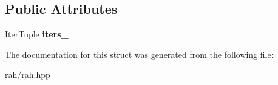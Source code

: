 \subsection*{Public Attributes}
\begin{DoxyCompactItemize}
\item 
\mbox{\label{struct_r_a_h___n_a_m_e_s_p_a_c_e_1_1view_1_1zip__iterator_aa562f95c73160c0980abbbedd2faf4c1}} 
Iter\+Tuple {\bfseries iters\+\_\+}
\end{DoxyCompactItemize}


The documentation for this struct was generated from the following file\+:\begin{DoxyCompactItemize}
\item 
rah/rah.\+hpp\end{DoxyCompactItemize}
